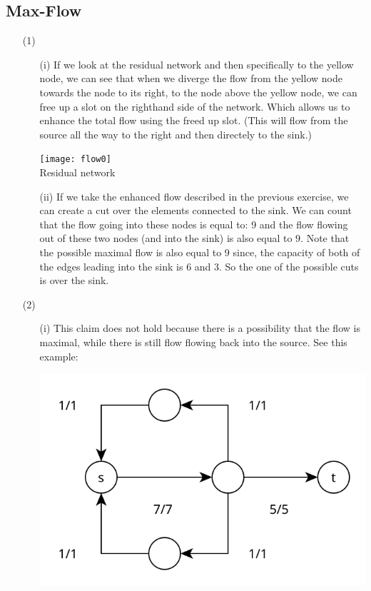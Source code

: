 \documentclass{article}
\begin{document}
\subsection*{Max-Flow}
\begin{itemize}
\item[(1)] \begin{itemize}
\item[(i)] If we look at the residual network and then specifically to the yellow node, we can see that when we diverge the flow from the yellow node towards the node to its right, to the node above the yellow node, we can free up a slot on the righthand side of the network. Which allows us to enhance the total flow using the freed up slot. (This will flow from the source all the way to the right and then directely to the sink.)

\begin{center}\texttt{[image: flow0]}\\Residual network\end{center}

\item[(ii)] If we take the enhanced flow described in the previous exercise, we can create a cut over the elements connected to the sink. We can count that the flow going into these nodes is equal to: 9 and the flow flowing out of these two nodes (and into the sink) is also equal to 9. Note that the possible maximal flow is also equal to 9 since, the capacity of both of the edges leading into the sink is 6 and 3. So the one of the possible cuts is over the sink.

\end{itemize}

\item[(2)] \begin{itemize}
\item[(i)] This claim does not hold because there is a possibility that the flow is maximal, while there is still flow flowing back into the source. See this example:

\begin{center}\includegraphics[scale=0.5]{backflow}\end{center}


\end{itemize}
\end{itemize}
\end{document}
